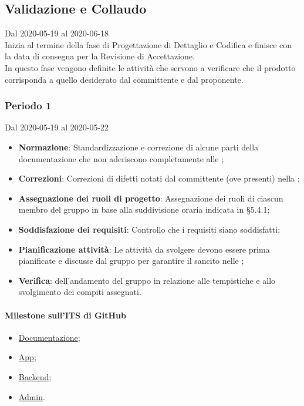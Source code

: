 \subsection{Validazione e Collaudo}
Dal 2020-05-19 al 2020-06-18\\
Inizia al termine della fase di Progettazione di Dettaglio e Codifica e finisce con la data di consegna per la Revisione di Accettazione.\\
In questo fase vengono definite le attività che servono a verificare che il prodotto corrisponda a quello desiderato dal committente e dal proponente.

\subsubsection{Periodo 1} 
Dal 2020-05-19 al 2020-05-22
\begin{itemize}
	\item \textbf{Normazione}: Standardizzazione e correzione di alcune parti della documentazione che non aderiscono completamente alle \NdP{};
	\item \textbf{Correzioni}: Correzioni di difetti notati dal committente (ove presenti) nella ;
	\item \textbf{Assegnazione dei ruoli di progetto}: Assegnazione dei ruoli di ciascun membro del gruppo in base alla suddivisione oraria indicata in §5.4.1;
	\item \textbf{Soddisfazione dei requisiti}: Controllo che i requisiti siano soddisfatti;
	\item \textbf{Pianificazione attività}: Le attività da svolgere devono essere prima pianificate e discusse dal gruppo per garantire il  sancito nelle \NdP{};
	\item \textbf{Verifica}:  dell'andamento del gruppo in relazione alle tempistiche e allo svolgimento dei compiti assegnati.
\end{itemize}
\paragraph{Milestone sull'ITS di GitHub}
\begin{itemize}
	\item \href{https://github.com/qb-team/Stalker-Documentazione/milestone/15}{Documentazione};
	\item \href{https://github.com/qb-team/Stalker-App/milestone/4}{App};
	\item \href{https://github.com/qb-team/Stalker-Backend/milestone/5}{Backend};
	\item \href{https://github.com/qb-team/Stalker-Admin/milestone/5}{Admin}.
\end{itemize}

